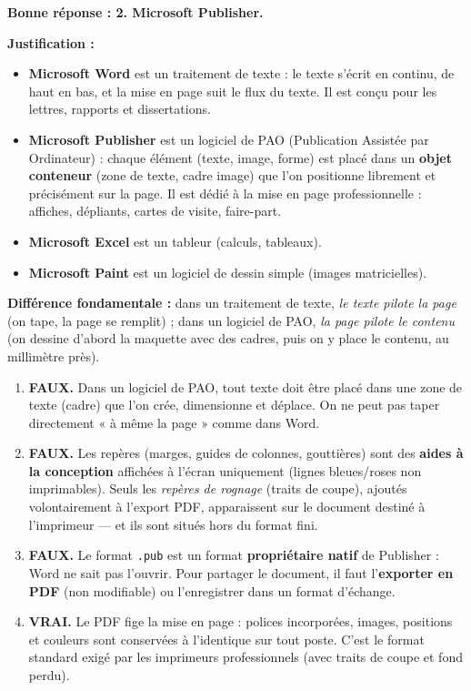 \documentclass[11pt]{article}
\newcommand{\cle}[1]{{\popxbold\color{popdark}#1}}
\begin{document}
\begin{corrige}
\textbf{Bonne réponse : 2. Microsoft Publisher.}

\textbf{Justification :}
\begin{itemize}
    \item \textbf{Microsoft Word} est un \cle{traitement de texte} : le texte s'écrit en continu, de haut en bas, et la mise en page suit le flux du texte. Il est conçu pour les lettres, rapports et dissertations.
    \item \textbf{Microsoft Publisher} est un logiciel de \cle{PAO} (Publication Assistée par Ordinateur) : chaque élément (texte, image, forme) est placé dans un \textbf{objet conteneur} (zone de texte, cadre image) que l'on positionne librement et précisément sur la page. Il est dédié à la mise en page professionnelle : affiches, dépliants, cartes de visite, faire-part.
    \item \textbf{Microsoft Excel} est un tableur (calculs, tableaux).
    \item \textbf{Microsoft Paint} est un logiciel de dessin simple (images matricielles).
\end{itemize}

\textbf{Différence fondamentale :} dans un traitement de texte, \emph{le texte pilote la page} (on tape, la page se remplit) ; dans un logiciel de PAO, \emph{la page pilote le contenu} (on dessine d'abord la maquette avec des cadres, puis on y place le contenu, au millimètre près).
\end{corrige}

\begin{corrige}
\begin{enumerate}
    \item \textbf{FAUX.} Dans un logiciel de PAO, tout texte doit être placé dans une \cle{zone de texte} (cadre) que l'on crée, dimensionne et déplace. On ne peut pas taper directement « à même la page » comme dans Word.
    \item \textbf{FAUX.} Les repères (marges, guides de colonnes, gouttières) sont des \textbf{aides à la conception} affichées à l'écran uniquement (lignes bleues/roses non imprimables). Seuls les \emph{repères de rognage} (traits de coupe), ajoutés volontairement à l'export PDF, apparaissent sur le document destiné à l'imprimeur — et ils sont situés hors du format fini.
    \item \textbf{FAUX.} Le format \texttt{.pub} est un format \textbf{propriétaire natif} de Publisher : Word ne sait pas l'ouvrir. Pour partager le document, il faut l'\textbf{exporter en PDF} (non modifiable) ou l'enregistrer dans un format d'échange.
    \item \textbf{VRAI.} Le PDF \cle{fige la mise en page} : polices incorporées, images, positions et couleurs sont conservées à l'identique sur tout poste. C'est le format standard exigé par les imprimeurs professionnels (avec traits de coupe et fond perdu).
\end{enumerate}
\end{corrige}
\end{document}
